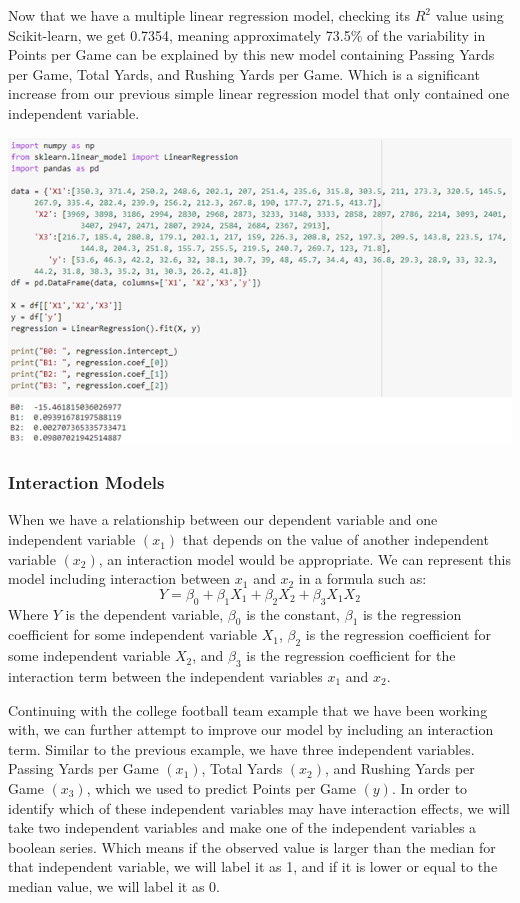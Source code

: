 \documentclass[a4paper,12pt]{report}
\begin{document}
Now that we have a multiple linear regression model, checking its $R^2$ value using Scikit-learn, we get 0.7354, meaning approximately 73.5\% of the variability in Points per Game can be explained by this new model containing Passing Yards per Game, Total Yards, and Rushing Yards per Game. Which is a significant increase from our previous simple linear regression model that only contained one independent variable. 

\begin{center}
    \captionsetup{type=figure}
    \includegraphics[width=.9\linewidth]{media/fullRegressionPic.png}
    \label{fig:fullRegressionPic}
\end{center}

\subsubsection{Interaction Models}
When we have a relationship between our dependent variable  and one independent variable $(x_1)$ that depends on the value of another independent variable $(x_2)$, an interaction model would be appropriate. We can represent this model including interaction between $x_1$ and $x_2$ in a formula such as:
$$Y=\beta_0+\beta_1X_1+\beta_2X_2+\beta_3X_1X_2$$
Where $Y$ is the dependent variable, $\beta_0$ is the constant, $\beta_1$ is the regression coefficient for some independent variable $X_1$, $\beta_2$ is the regression coefficient for some independent variable $X_2$, and $\beta_3$ is the regression coefficient for the interaction term between the independent variables $x_1$ and $x_2$.

Continuing with the college football team example that we have been working with, we can further attempt to improve our model by including an interaction term. Similar to the previous example, we have three independent variables. Passing Yards per Game $(x_1)$, Total Yards $(x_2)$, and Rushing Yards per Game $(x_3)$, which we used to predict Points per Game $(y)$. In order to identify which of these independent variables may have interaction effects, we will take two independent variables and make one of the independent variables a boolean series. Which means if the observed value is larger than the median for that independent variable, we will label it as 1, and if it is lower or equal to the median value, we will label it as 0.
\end{document}
